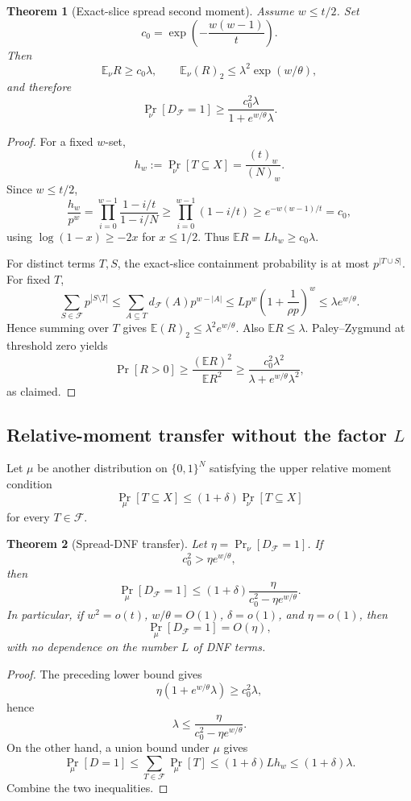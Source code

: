 \documentclass[11pt]{article}
\newtheorem{theorem}{Theorem}
\begin{document}
\begin{theorem}[Exact-slice spread second moment]
Assume $w\le t/2$. Set
\[c_0=\exp\!\left(-\frac{w(w-1)}t\right).\]
Then
\[\mathbb E_\nu R\ge c_0\lambda,\qquad \mathbb E_\nu(R)_2\le \lambda^2\exp(w/\theta),\]
and therefore
\[\boxed{\Pr_\nu[D_{\mathcal F}=1]\ge \frac{c_0^2\lambda}{1+e^{w/\theta}\lambda}.}\]
\end{theorem}
\begin{proof}
For a fixed $w$-set,
\[h_w:=\Pr_\nu[T\subseteq X]=\frac{(t)_w}{(N)_w}.\]
Since $w\le t/2$,
\[\frac{h_w}{p^w}=\prod_{i=0}^{w-1}\frac{1-i/t}{1-i/N}\ge\prod_{i=0}^{w-1}(1-i/t)\ge e^{-w(w-1)/t}=c_0,\]
using $\log(1-x)\ge-2x$ for $x\le1/2$. Thus $\mathbb E R=Lh_w\ge c_0\lambda$.

For distinct terms $T,S$, the exact-slice containment probability is at most $p^{|T\cup S|}$. For fixed $T$,
\[\sum_{S\in\mathcal F}p^{|S\setminus T|}\le\sum_{A\subseteq T}d_{\mathcal F}(A)p^{w-|A|}\le Lp^w\left(1+\frac1{\rho p}\right)^w\le\lambda e^{w/\theta}.\]
Hence summing over $T$ gives $\mathbb E(R)_2\le\lambda^2e^{w/\theta}$. Also $\mathbb E R\le\lambda$. Paley--Zygmund at threshold zero yields
\[\Pr[R>0]\ge\frac{(\mathbb E R)^2}{\mathbb E R^2}\ge\frac{c_0^2\lambda^2}{\lambda+e^{w/\theta}\lambda^2},\]
as claimed.
\end{proof}

\subsection{Relative-moment transfer without the factor $L$}
Let $\mu$ be another distribution on $\{0,1\}^N$ satisfying the upper relative moment condition
\[\Pr_\mu[T\subseteq X]\le(1+\delta)\Pr_\nu[T\subseteq X]\]
for every $T\in\mathcal F$.

\begin{theorem}[Spread-DNF transfer]
Let $\eta=\Pr_\nu[D_{\mathcal F}=1]$. If
\[c_0^2>\eta e^{w/\theta},\]
then
\[\boxed{\Pr_\mu[D_{\mathcal F}=1]\le (1+\delta)\frac{\eta}{c_0^2-\eta e^{w/\theta}}.}\]
In particular, if $w^2=o(t)$, $w/\theta=O(1)$, $\delta=o(1)$, and $\eta=o(1)$, then
\[\Pr_\mu[D_{\mathcal F}=1]=O(\eta),\]
with no dependence on the number $L$ of DNF terms.
\end{theorem}
\begin{proof}
The preceding lower bound gives
\[\eta(1+e^{w/\theta}\lambda)\ge c_0^2\lambda,\]
hence
\[\lambda\le\frac{\eta}{c_0^2-\eta e^{w/\theta}}.\]
On the other hand, a union bound under $\mu$ gives
\[\Pr_\mu[D=1]\le\sum_{T\in\mathcal F}\Pr_\mu[T]\le(1+\delta)Lh_w\le(1+\delta)\lambda.\]
Combine the two inequalities.
\end{proof}
\end{document}
